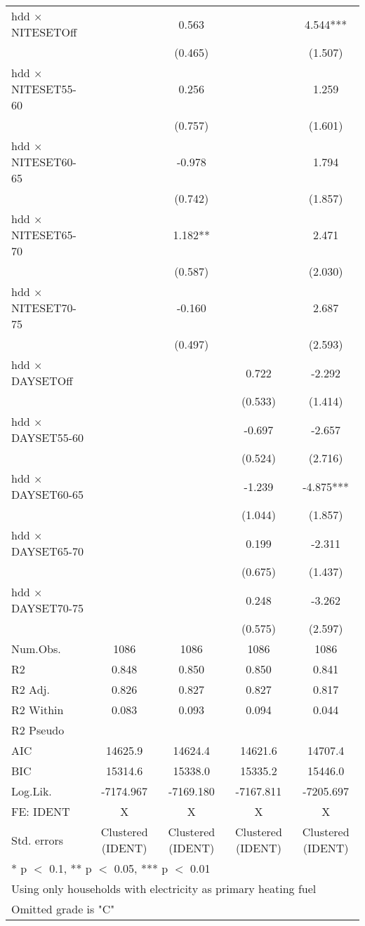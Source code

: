 \documentclass[
]{article}
\begin{document}
\begin{table}
{\begin{tabular}[t]{lcccc}
hdd × NITESETOff &  & 0.563 &  & 4.544***\\
 &  & (0.465) &  & (1.507)\\
hdd × NITESET55-60 &  & 0.256 &  & 1.259\\
 &  & (0.757) &  & (1.601)\\
hdd × NITESET60-65 &  & -0.978 &  & 1.794\\
 &  & (0.742) &  & (1.857)\\
hdd × NITESET65-70 &  & 1.182** &  & 2.471\\
 &  & (0.587) &  & (2.030)\\
hdd × NITESET70-75 &  & -0.160 &  & 2.687\\
 &  & (0.497) &  & (2.593)\\
hdd × DAYSETOff &  &  & 0.722 & -2.292\\
 &  &  & (0.533) & (1.414)\\
hdd × DAYSET55-60 &  &  & -0.697 & -2.657\\
 &  &  & (0.524) & (2.716)\\
hdd × DAYSET60-65 &  &  & -1.239 & -4.875***\\
 &  &  & (1.044) & (1.857)\\
hdd × DAYSET65-70 &  &  & 0.199 & -2.311\\
 &  &  & (0.675) & (1.437)\\
hdd × DAYSET70-75 &  &  & 0.248 & -3.262\\
 &  &  & (0.575) & (2.597)\\
\midrule
Num.Obs. & 1086 & 1086 & 1086 & 1086\\
R2 & 0.848 & 0.850 & 0.850 & 0.841\\
R2 Adj. & 0.826 & 0.827 & 0.827 & 0.817\\
R2 Within & 0.083 & 0.093 & 0.094 & 0.044\\
R2 Pseudo &  &  &  & \\
AIC & 14625.9 & 14624.4 & 14621.6 & 14707.4\\
BIC & 15314.6 & 15338.0 & 15335.2 & 15446.0\\
Log.Lik. & -7174.967 & -7169.180 & -7167.811 & -7205.697\\
FE: IDENT & X & X & X & X\\
Std. errors & Clustered (IDENT) & Clustered (IDENT) & Clustered (IDENT) & Clustered (IDENT)\\
\bottomrule
\multicolumn{5}{l}{\textsuperscript{} * p $<$ 0.1, ** p $<$ 0.05, *** p $<$ 0.01}\\
\multicolumn{5}{l}{\textsuperscript{} Using only households with electricity as primary heating fuel}\\
\multicolumn{5}{l}{\textsuperscript{} Omitted grade is "C"}\\
\end{tabular}}
\end{table}
\end{document}
